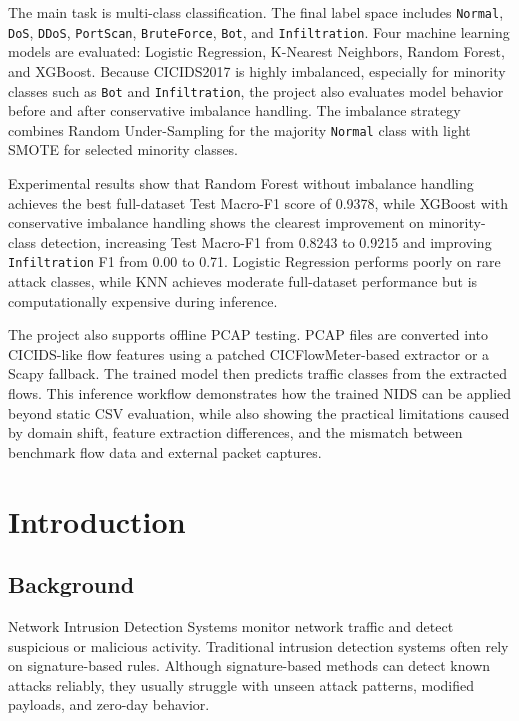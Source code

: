 \documentclass[12pt,a4paper]{article}
\begin{document}
The main task is multi-class classification. The final label space includes \texttt{Normal}, \texttt{DoS}, \texttt{DDoS}, \texttt{PortScan}, \texttt{BruteForce}, \texttt{Bot}, and \texttt{Infiltration}. Four machine learning models are evaluated: Logistic Regression, K-Nearest Neighbors, Random Forest, and XGBoost. Because CICIDS2017 is highly imbalanced, especially for minority classes such as \texttt{Bot} and \texttt{Infiltration}, the project also evaluates model behavior before and after conservative imbalance handling. The imbalance strategy combines Random Under-Sampling for the majority \texttt{Normal} class with light SMOTE for selected minority classes.

Experimental results show that Random Forest without imbalance handling achieves the best full-dataset Test Macro-F1 score of 0.9378, while XGBoost with conservative imbalance handling shows the clearest improvement on minority-class detection, increasing Test Macro-F1 from 0.8243 to 0.9215 and improving \texttt{Infiltration} F1 from 0.00 to 0.71. Logistic Regression performs poorly on rare attack classes, while KNN achieves moderate full-dataset performance but is computationally expensive during inference.

The project also supports offline PCAP testing. PCAP files are converted into CICIDS-like flow features using a patched CICFlowMeter-based extractor or a Scapy fallback. The trained model then predicts traffic classes from the extracted flows. This inference workflow demonstrates how the trained NIDS can be applied beyond static CSV evaluation, while also showing the practical limitations caused by domain shift, feature extraction differences, and the mismatch between benchmark flow data and external packet captures.

\clearpage
\tableofcontents
\clearpage
{}

\section{Introduction}

\subsection{Background}

Network Intrusion Detection Systems monitor network traffic and detect suspicious or malicious activity. Traditional intrusion detection systems often rely on signature-based rules. Although signature-based methods can detect known attacks reliably, they usually struggle with unseen attack patterns, modified payloads, and zero-day behavior.
\end{document}
